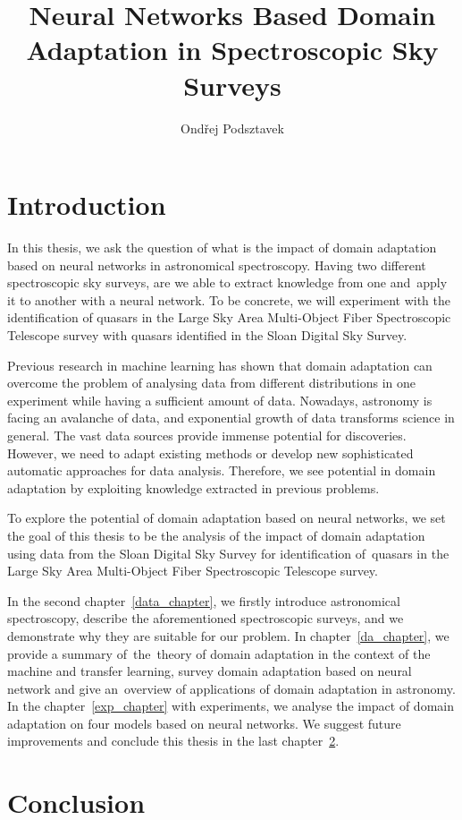 \documentclass[thesis=M,english]{FITthesis}[2012/10/20]
\title{Neural Networks Based Domain Adaptation in Spectroscopic Sky Surveys}
\author{Ondřej Podsztavek}
\begin{document}
\chapter{Introduction}

In this thesis, we ask the question of what is the impact of domain adaptation based on neural networks in astronomical spectroscopy. Having two different spectroscopic sky surveys, are we able to extract knowledge from one and~apply it to another with a neural network. To be concrete, we will experiment with the identification of quasars in the Large Sky Area Multi-Object Fiber Spectroscopic Telescope survey with quasars identified in the Sloan Digital Sky Survey.

Previous research in machine learning has shown that domain adaptation can overcome the problem of analysing data from different distributions in one experiment while having a sufficient amount of data. Nowadays, astronomy is facing an avalanche of data, and exponential growth of data transforms science in general. The vast data sources provide immense potential for discoveries. However, we need to adapt existing methods or develop new sophisticated automatic approaches for data analysis. Therefore, we see potential in domain adaptation by exploiting knowledge extracted in previous problems.

To explore the potential of domain adaptation based on neural networks, we set the goal of this thesis to be the analysis of the impact of domain adaptation using data from the Sloan Digital Sky Survey for identification of~quasars in the Large Sky Area Multi-Object Fiber Spectroscopic Telescope survey.

In the second chapter~\ref{data_chapter}, we firstly introduce astronomical spectroscopy, describe the aforementioned spectroscopic surveys, and we demonstrate why they are suitable for our problem.
In chapter~\ref{da_chapter}, we provide a summary of~the~theory of domain adaptation in the context of the machine and transfer learning,  survey domain adaptation based on neural network and give an~overview of applications of domain adaptation in astronomy.
In the chapter~\ref{exp_chapter} with experiments, we analyse the impact of domain adaptation on four models based on neural networks. We suggest future improvements and conclude this thesis in the last chapter~\ref{conclusion}.





\chapter{Conclusion}
\label{conclusion}
\end{document}
